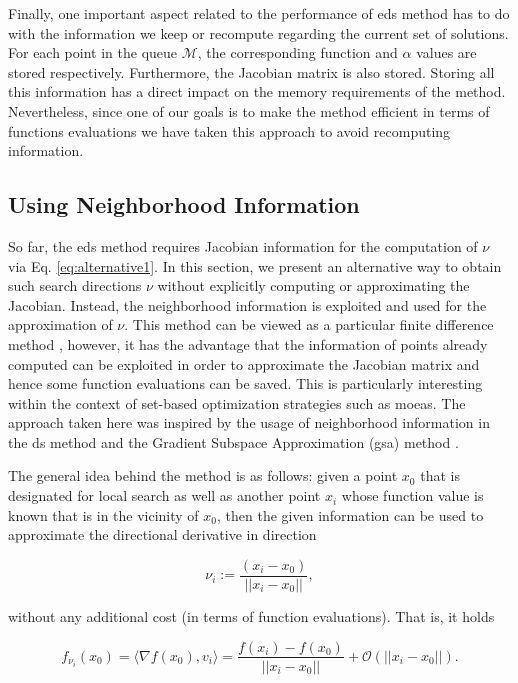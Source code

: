 Finally, one important aspect related to the performance of \gls{eds} method has to do with the information we keep or recompute regarding the current set of solutions. For each point in the queue $\mathcal{M}$, the corresponding function and $\alpha$ values are stored respectively. Furthermore, the Jacobian matrix is also stored. Storing all this information has a direct impact on the memory requirements of the method. Nevertheless, since one of our goals is to make the method efficient in terms of functions evaluations we have taken this approach to avoid recomputing information.

\subsection{Using Neighborhood Information}
\label{sec:neigh_info}

So far, the \gls{eds} method requires Jacobian information for the computation of $\nu$ via Eq. \eqref{eq:alternative1}. In this section, we present an alternative way to obtain such search directions $\nu$ without explicitly computing or approximating the Jacobian. Instead, the neighborhood information is exploited and used for the approximation of $\nu$. This method can be viewed as a particular finite difference method \cite{nocedal}, however, it has the advantage that the information of points already computed can be exploited in order to approximate the Jacobian matrix and hence some function evaluations can be saved. This is particularly interesting within the context of set-based optimization strategies such as \glspl{moea}. The approach taken here was inspired by the usage of neighborhood information in the \gls{ds} method \cite{directed_search} and the Gradient Subspace Approximation (\gls{gsa}) method \cite{gsa}.

The general idea behind the method is as follows: given a point $x_0$ that is designated for local search as well as another point $x_i$ whose function value is known that is in the vicinity of $x_0$, then the given information can be used to approximate the directional derivative in direction

\begin{equation}
\nu_i := \frac{(x_i - x_0)}{|| x_i - x_0 ||}, 
\label{eq:directional_der_info}
\end{equation}

without any additional cost (in terms of function evaluations). That is, it holds

\begin{equation}
f_{\nu_i}(x_0) = \langle \nabla f(x_0), v_i \rangle = \frac{f(x_i) - f(x_0)}{|| x_i - x_0 ||} + \mathcal{O}(|| x_i - x_0 ||).
\label{eq:directional_der}
\end{equation}

